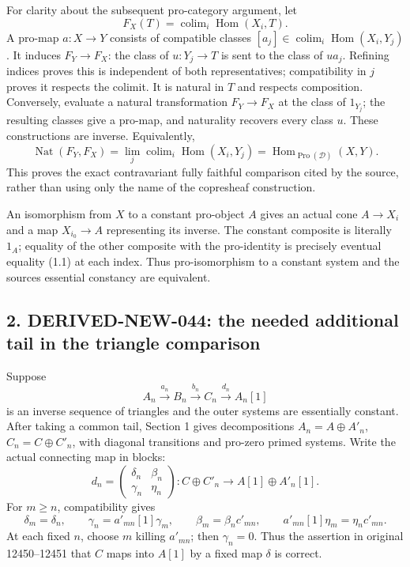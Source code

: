 \documentclass[11pt]{article}
\begin{document}
For clarity about the subsequent pro-category argument,\allowbreak{} let \[
F_X(T)=\operatorname{colim}_i\operatorname{Hom}(X_i,T).
\] A pro-map \(a:X\to Y\) consists of compatible classes \([a_j]\in\operatorname{colim}_i\operatorname{Hom}(X_i,Y_j)\). It induces \(F_Y\to F_X\):\allowbreak{} the class of \(u:Y_j\to T\) is sent to the class of \(u a_j\). Refining indices proves this is independent of both representatives; compatibility in \(j\) proves it respects the colimit. It is natural in \(T\) and respects composition. Conversely,\allowbreak{} evaluate a natural transformation \(F_Y\to F_X\) at the class of \(1_{Y_j}\); the resulting classes give a pro-map,\allowbreak{} and naturality recovers every class \(u\). These constructions are inverse. Equivalently,\allowbreak{} \[
\operatorname{Nat}(F_Y,F_X)
 =\lim_j\operatorname{colim}_i\operatorname{Hom}(X_i,Y_j)
 =\operatorname{Hom}_{\operatorname{Pro}(\mathcal D)}(X,Y). \tag{1.2}
\] This proves the exact contravariant fully faithful comparison cited by the source,\allowbreak{} rather than using only the name of the copresheaf construction.

An isomorphism from \(X\) to a constant pro-object \(A\) gives an actual cone \(A\to X_i\) and a map \(X_{i_0}\to A\) representing its inverse. The constant composite is literally \(1_A\); equality of the other composite with the pro-identity is precisely eventual equality (1.1)\allowbreak{} at each index. Thus pro-isomorphism to a constant system and the source\textquotesingle s essential constancy are equivalent.

\subsection{\texorpdfstring{2. DERIVED-NEW-044:\allowbreak{} the needed additional tail in the triangle comparison}{2.  the needed additional tail in the triangle comparison}}\label{proofs-12380-12604-derived-new-044-the-needed-additional-tail-in-the-triangle-comparison}

Suppose \[
A_n\xrightarrow{a_n}B_n\xrightarrow{b_n}C_n
 \xrightarrow{d_n}A_n[1] \tag{2.1}
\] is an inverse sequence of triangles and the outer systems are essentially constant. After taking a common tail,\allowbreak{} Section 1 gives decompositions \(A_n=A\oplus A'_n\),\allowbreak{} \(C_n=C\oplus C'_n\),\allowbreak{} with diagonal transitions and pro-zero primed systems. Write the actual connecting map in blocks:\allowbreak{} \[
d_n=
\begin{pmatrix}
\delta_n&\beta_n\\
\gamma_n&\eta_n
\end{pmatrix}
:C\oplus C'_n\longrightarrow A[1]\oplus A'_n[1]. \tag{2.2}
\] For \(m\geq n\),\allowbreak{} compatibility gives \[
\delta_m=\delta_n,\qquad
\gamma_n=a'_{mn}[1]\gamma_m,\qquad
\beta_m=\beta_n c'_{mn},\qquad
a'_{mn}[1]\eta_m=\eta_n c'_{mn}. \tag{2.3}
\] At each fixed \(n\),\allowbreak{} choose \(m\) killing \(a'_{mn}\); then \(\gamma_n=0\). Thus the assertion in original 12450–\allowbreak{}12451 that \(C\) maps into \(A[1]\) by a fixed map \(\delta\) is correct.
\end{document}
